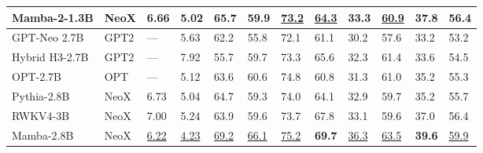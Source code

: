 \begin{table*}[ht]
{\begin{tabular}{@{}llllllllllll@{}}
      \textbf{Mamba-2-1.3B} & NeoX        & \textbf{6.66}              & \textbf{5.02}              & \textbf{65.7}             & \textbf{59.9}              & \underline{73.2}          & \underline{64.3}          & \textbf{33.3}                         & \underline{60.9}                        & \textbf{37.8}                           & \textbf{56.4} \\
      \midrule
      GPT-Neo 2.7B          & GPT2        & ---                        & 5.63                       & 62.2                      & 55.8                       & 72.1                      & 61.1                      & 30.2                                  & 57.6                                    & 33.2                                    & 53.2 \\
      Hybrid H3-2.7B        & GPT2        & ---                        & 7.92                       & 55.7                      & 59.7                       & 73.3                      & 65.6                      & 32.3                                  & 61.4                                    & 33.6                                    & 54.5 \\
      OPT-2.7B              & OPT         & ---                        & 5.12                       & 63.6                      & 60.6                       & 74.8                      & 60.8                      & 31.3                                  & 61.0                                    & 35.2                                    & 55.3 \\
      Pythia-2.8B           & NeoX        & 6.73                       & 5.04                       & 64.7                      & 59.3                       & 74.0                      & 64.1                      & 32.9                                  & 59.7                                    & 35.2                                    & 55.7 \\
      RWKV4-3B              & NeoX        & 7.00                       & 5.24                       & 63.9                      & 59.6                       & 73.7                      & 67.8                      & 33.1                                  & 59.6                                    & 37.0                                    & 56.4 \\
      Mamba-2.8B            & NeoX        & \underline{6.22}           & \underline{4.23}           & \underline{69.2}          & \underline{66.1}           & \underline{75.2}          & \textbf{69.7}             & \underline{36.3}                      & \underline{63.5}                        & \textbf{39.6}                           & \underline{59.9} \\

\end{tabular}}
\end{table*}
